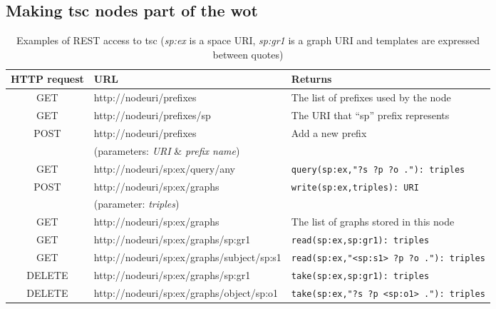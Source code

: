 

\subsection{Making \acs{tsc} nodes part of the \acs{wot}}

\begin{table*}[t!] %
\centering
\caption {Examples of REST access to \ac{tsc} (\textit{sp:ex} is a space URI, \textit{sp:gr1} is a graph URI and templates are expressed between quotes)}
\begin{tabular}{|c|l|l|}
\hline
HTTP request & URL & Returns \\
\hline \hline
GET & http://nodeuri/prefixes & The list of prefixes used by the node \\
GET & http://nodeuri/prefixes/sp & The URI that ``sp'' prefix represents \\
POST & http://nodeuri/prefixes & Add a new prefix \\
 & \hspace{0.5cm}(parameters: \textit{URI} \& \textit{prefix name}) & \\
GET & http://nodeuri/sp:ex/query/any & \texttt{query(sp:ex,"?s ?p ?o ."): triples} \\
POST & http://nodeuri/sp:ex/graphs & \texttt{write(sp:ex,triples): URI} \\
 & \hspace{0.5cm}(parameter: \textit{triples}) & \\
GET & http://nodeuri/sp:ex/graphs & The list of graphs stored in this node \\
GET & http://nodeuri/sp:ex/graphs/sp:gr1 & \texttt{read(sp:ex,sp:gr1): triples} \\
GET & http://nodeuri/sp:ex/graphs/subject/sp:s1 & \texttt{read(sp:ex,"<sp:s1> ?p ?o ."): triples} \\
DELETE & http://nodeuri/sp:ex/graphs/sp:gr1 & \texttt{take(sp:ex,sp:gr1): triples} \\
DELETE & http://nodeuri/sp:ex/graphs/object/sp:o1 & \texttt{take(sp:ex,"?s ?p <sp:o1> ."): triples} \\
\hline
\end{tabular}
\label{tab:WoT2TS}
\end{table*}

